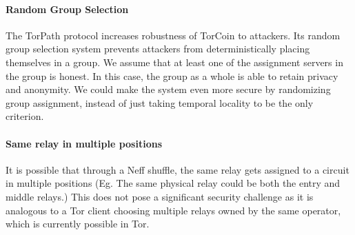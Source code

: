 {\paragraph{Random Group Selection} The TorPath protocol increases
robustness of TorCoin to attackers. Its random group selection system prevents
attackers from deterministically placing themselves in a group. We assume that
at least one of the assignment servers in the group is honest. In this case,
the group as a whole is able to retain privacy and anonymity. We could make
the system even more secure by randomizing group assignment, instead of just
taking temporal locality to be the only criterion.

\paragraph{Same relay in multiple positions}  It is possible that through
a Neff shuffle, the same relay gets assigned to a circuit in multiple
positions (Eg. The same physical relay could be both the entry and middle
relays.) This does not pose a significant security challenge as it is
analogous to a Tor client choosing multiple relays owned by the same operator,
which is currently possible in Tor.






}
